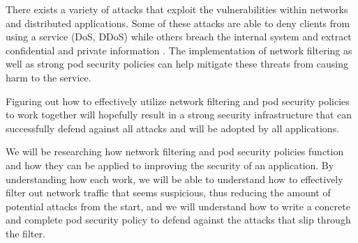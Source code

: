 There exists a variety of attacks that exploit the vulnerabilities 
within networks and distributed applications. Some of these attacks
are able to deny clients from using a service (DoS, DDoS) while others
breach the internal system and extract confidential and private information \cite{mns}.
The implementation of network filtering as well as strong pod security policies can 
help mitigate these threats from causing harm to the service.

Figuring out how to effectively utilize network filtering and
pod security policies to work together will hopefully result
in a strong security infrastructure that can successfully
defend against all attacks and will be adopted by all applications.

We will be researching how network filtering and pod security policies
function and how they can be applied to improving the security of
an application. By understanding how each work, we will be able to
understand how to effectively filter out network traffic that seems
suspicious, thus reducing the amount of potential attacks from the
start, and we will understand how to write a concrete and complete
pod security policy to defend against the attacks that slip through
the filter.

